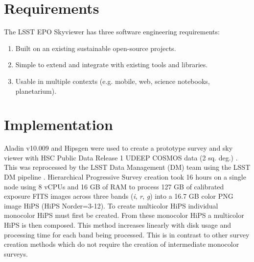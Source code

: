 \documentclass[11pt,twoside]{article}
\begin{document}

\section{Requirements}
The LSST EPO Skyviewer has three software engineering requirements:
\begin{enumerate}
\item Built on an existing sustainable open-source projects.
\item Simple to extend and integrate with existing tools and libraries.
\item Usable in multiple contexts (e.g. mobile, web, science notebooks, planetarium).
\end{enumerate}

\section{Implementation}
Aladin v10.009 and Hipsgen were used to create a prototype survey and sky viewer with HSC Public Data Release 1 UDEEP COSMOS data (2 sq. deg.) \citep{2017arXiv170208449A}. This was reprocessed by the LSST Data Management (DM) team using the LSST DM pipeline \citep{2015arXiv151207914J}. Hierarchical Progressive Survey \citep[HiPS,][]{2015A&A...578A.114F} creation took 16 hours on a single node using 8 vCPUs and 16 GB of RAM to process 127 GB of calibrated exposure FITS images across three bands (\emph{i}, \emph{r}, \emph{g}) into a 16.7 GB color PNG image HiPS (HiPS Norder=3-12). To create multicolor HiPS individual monocolor HiPS must first be created. From these monocolor HiPS a multicolor HiPS is then composed. This method increases linearly with disk usage and processing time for each band being processed. This is in contrast to other survey creation methods which do not require the creation of intermediate monocolor surveys.
\end{document}
